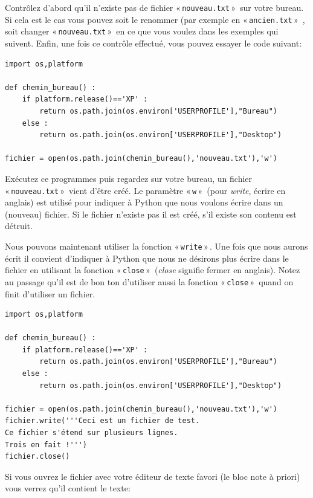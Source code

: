 Contrôlez d'abord qu'il n'existe pas de fichier « \texttt{nouveau.txt} »  sur votre bureau. Si cela est le cas vous pouvez soit le renommer (par exemple en « \texttt{ancien.txt} »  , soit changer « \texttt{nouveau.txt} »  en ce que vous voulez dans les exemples qui suivent. Enfin, une fois ce contrôle effectué, vous pouvez essayer le code suivant:

\begin{Verbatim}[frame=single,rulecolor=\color{mbleu}, label=à taper par exemple en reprenant l'existant]
import os,platform

def chemin_bureau() :
    if platform.release()=='XP' :
        return os.path.join(os.environ['USERPROFILE'],"Bureau")
    else :
        return os.path.join(os.environ['USERPROFILE'],"Desktop")
    
fichier = open(os.path.join(chemin_bureau(),'nouveau.txt'),'w')
\end{Verbatim}

Exécutez ce programmes puis regardez sur votre bureau, un fichier « \texttt{nouveau.txt} »  vient d'être créé. Le paramètre « \texttt{w} »  (pour \emph{write}, écrire en anglais) est utilisé pour indiquer à Python que nous voulons écrire dans un (nouveau) fichier. Si le fichier n'existe pas il est créé, s'il existe son contenu est détruit.

Nous pouvons maintenant utiliser la fonction « \texttt{write} » . Une fois que nous aurons écrit il convient d'indiquer à Python que nous ne désirons plus écrire dans le fichier en utilisant la fonction « \texttt{close} »  (\emph{close} signifie fermer en anglais). Notez au passage qu'il est de bon ton d'utiliser aussi la fonction « \texttt{close} »  quand on finit d'utiliser un fichier.
 
\begin{Verbatim}[frame=single,rulecolor=\color{mbleu}, label=à taper par exemple en reprenant l'existant]
import os,platform

def chemin_bureau() :
    if platform.release()=='XP' :
        return os.path.join(os.environ['USERPROFILE'],"Bureau")
    else :
        return os.path.join(os.environ['USERPROFILE'],"Desktop")
    
fichier = open(os.path.join(chemin_bureau(),'nouveau.txt'),'w')
fichier.write('''Ceci est un fichier de test.
Ce fichier s'étend sur plusieurs lignes.
Trois en fait !''')
fichier.close()
\end{Verbatim}

Si vous ouvrez le fichier avec votre éditeur de texte favori (le bloc note à priori) vous verrez qu'il contient le texte:

